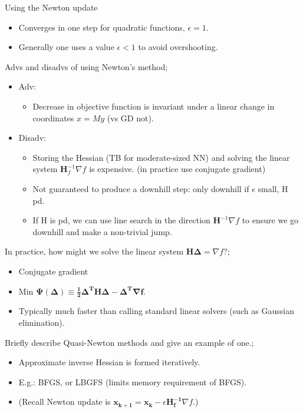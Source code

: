 \documentclass{article}
\begin{document}
Using the Newton update \begin{itemize}
	\item Converges in one step for quadratic functions, $\epsilon = 1$.
	\item Generally one uses a value $\epsilon < 1$ to avoid overshooting.
\end{itemize}

Advs and disadvs of using Newton's method; \begin{itemize}
	\item Adv: \begin{itemize}
	\item Decrease in objective function is invariant under a linear change in coordinates $x=My$ (vs GD not).
\end{itemize}
\item Disadv: \begin{itemize}
	\item Storing the Hessian (TB for moderate-sized NN) and solving the linear system $\mathbf{H}_f^{-1}\nabla f$ is expensive. (in practice use conjugate gradient)
	\item Not guaranteed to produce a downhill step: only downhill if $\epsilon$ small, H pd.
	\item If H is pd, we can use line search in the direction $\mathbf{H}^{-1}\nabla f$ to ensure we go downhill and make a non-trivial jump.
\end{itemize}
\end{itemize}

In practice, how might we solve the linear system $\mathbf{H\Delta}=\nabla f$?; \begin{itemize}
	\item Conjugate gradient
	\item Min $\mathbf{\Psi(\Delta)\equiv \frac{1}{2}\Delta^TH\Delta -\Delta^T\nabla f}$. 
	\item Typically much faster than calling standard linear solvers (such as Gaussian elimination).
\end{itemize}

Briefly describe Quasi-Newton methods and give an example of one.; \begin{itemize}
	\item Approximate inverse Hessian is formed iteratively.
	\item E.g.: BFGS, or LBGFS (limits memory requirement of BFGS).
	\item (Recall Newton update is $\mathbf{x_{k+1} = x_k} - \epsilon\mathbf{H^{-1}_f}\nabla f$.)
\end{itemize}
\end{document}
